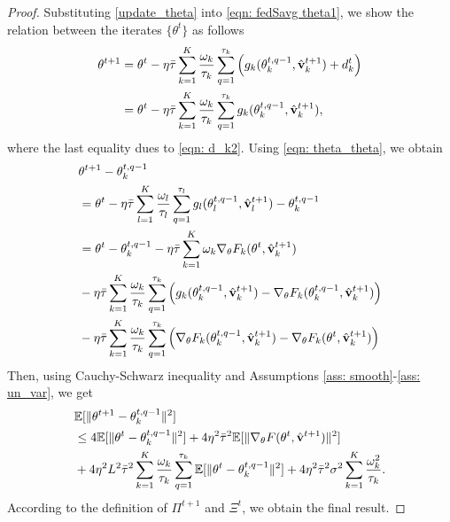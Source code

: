\documentclass[twoside,journal]{IEEEtran}
\def\VectorFont{\bf}
\newcommand{\vv}{{\VectorFont v}}
\begin{document}
\begin{proof}
Substituting \eqref{update_theta} into \eqref{eqn: fedSavg theta1}, we show the relation between the iterates $\{\theta^t\}$ as follows
\begin{align}
\nonumber\theta^{t+1}&= \theta^{t} - \eta\bar{\tau} \sum_{k=1}^K\frac{\omega_k}{\tau_k}\sum_{q=1}^{\tau_k}\Big(
g_k(\theta_k^{t,q-1},\hat{\vv}_{k}^{t+1})+d_k^t\Big)\\
&=\theta^{t} - \eta\bar{\tau} \sum_{k=1}^K\frac{\omega_k}{\tau_k}\sum_{q=1}^{\tau_k}
g_k(\theta_k^{t,q-1},\hat{\vv}_{k}^{t+1}),
\label{eqn: theta_theta}
\end{align}
where the last equality dues to \eqref{eqn: d_k2}.
Using \eqref{eqn: theta_theta}, we obtain
\begin{align*}
&\theta^{t+1}-\theta_k^{t,q-1}\\
&=
\theta^{t} - \eta\bar{\tau} \sum_{l=1}^K\frac{\omega_l}{\tau_l}\sum_{q=1}^{\tau_l}
g_l(\theta_l^{t,q-1},\hat{\vv}_{l}^{t+1})-\theta_k^{t,q-1}\\
&=\theta^{t} -\theta_k^{t,q-1}-\eta\bar{\tau}\sum_{k=1}^K\omega_k\nabla_{\theta} F_k(\theta^{t},\hat{\vv}_{k}^{t+1})\\
&- \eta\bar{\tau} \sum_{k=1}^K\frac{\omega_k}{\tau_k}\sum_{q=1}^{\tau_k}
\Big(g_k(\theta_k^{t,q-1},\hat{\vv}_{k}^{t+1})-\nabla_{\theta} F_k(\theta_k^{t,q-1},\hat{\vv}_{k}^{t+1})\Big)\\
&-\eta\bar{\tau} \sum_{k=1}^K\frac{\omega_k}{\tau_k}\sum_{q=1}^{\tau_k}
\Big(\nabla_{\theta} F_k(\theta_k^{t,q-1},\hat{\vv}_{k}^{t+1})-\nabla_{\theta} F_k(\theta^{t},\hat{\vv}_{k}^{t+1})\Big)
\end{align*}
Then, using Cauchy-Schwarz inequality and Assumptions \ref{ass: smooth}-\ref{ass: un_var}, we get
\begin{align*}
&\mathbb{E}[\|\theta^{t+1}-\theta_k^{t,q-1}\|^2]\\
&\leq 4\mathbb{E}[\|\theta^{t} -\theta_k^{t,q-1}\|^2]
+4\eta^2\bar{\tau}^2
\mathbb{E}[\|\nabla_{\theta} F(\theta^{t},\hat{\vv}^{t+1})\|^2]\\
&+4\eta^2L^2\bar{\tau}^2\sum_{k=1}^K\frac{\omega_k}{\tau_k}\sum_{q=1}^{\tau_k}
\mathbb{E}[\|\theta^t-\theta_k^{t,q-1}\|^2] +4\eta^2\bar{\tau}^2\sigma^2\sum_{k=1}^K\frac{\omega_k^2}{\tau_k}.
\end{align*}
According to the definition of $\Pi^{t+1}$ and $\Xi^t$, we obtain the final result.
\end{proof}
\end{document}
